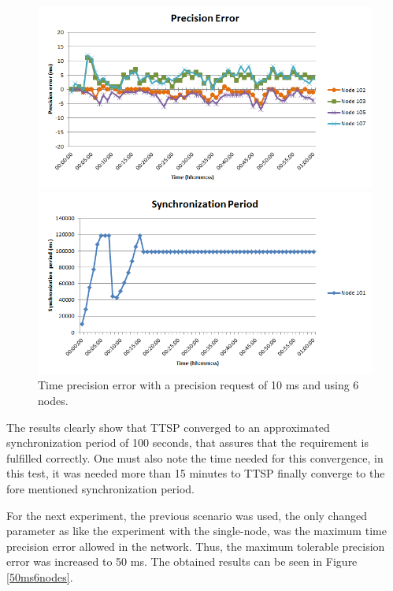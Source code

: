 \documentclass[11pt,a4]{article}
\begin{document}
\begin{multicols}{2}
\begin{figure}[!t]
\begin{minipage}[b]{0.5\linewidth}
\includegraphics[scale=0.3]{./images/11-ttsp-10ms6nodes-error.png}
\end{minipage}
\hspace{0.5cm}
\begin{minipage}[b]{0.5\linewidth}
\includegraphics[scale=0.3]{./images/12-ttsp-10ms6nodes-period.png}
\end{minipage}
\caption{Time precision error with a precision request of 10 ms and using 6 nodes.}
\label{10ms6nodes}
\end{figure}

The results clearly show that TTSP converged to an approximated synchronization period of 100 seconds, that assures that the requirement is fulfilled correctly. One must also note the time needed for this convergence, in this test, it was needed more than 15 minutes to TTSP finally converge to the fore mentioned synchronization period.

For the next experiment, the previous scenario was used, the only changed parameter as like the experiment with the single-node, was the maximum time precision error allowed in the network. Thus, the maximum tolerable precision error was increased to 50 ms. The obtained results can be seen in Figure \ref{50ms6nodes}.


\end{multicols}
\end{document}
